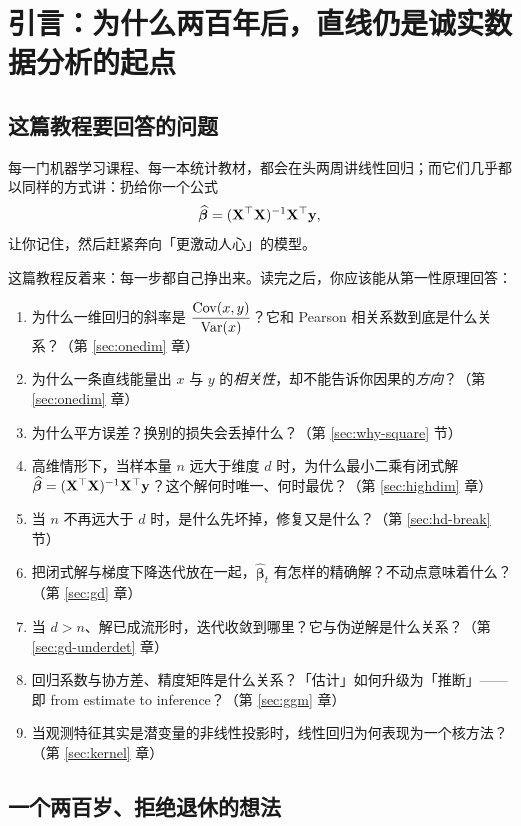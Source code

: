 \section{引言：为什么两百年后，直线仍是诚实数据分析的起点}\label{sec:intro}

\subsection{这篇教程要回答的问题}

每一门机器学习课程、每一本统计教材，都会在头两周讲线性回归；而它们几乎都以同样的方式讲：扔给你一个公式
\[
  \widehat{\bm{\beta}} = (\mathbf{X}^\top \mathbf{X})^{-1} \mathbf{X}^\top \mathbf{y},
\]
让你记住，然后赶紧奔向「更激动人心」的模型。

这篇教程反着来：每一步都自己挣出来。读完之后，你应该能从第一性原理回答：

\begin{enumerate}[label=(\arabic*)]
  \item 为什么一维回归的斜率是 $\dfrac{\mathrm{Cov}(x,y)}{\mathrm{Var}(x)}$？它和 Pearson 相关系数到底是什么关系？（第 \ref{sec:onedim} 章）
  \item 为什么一条直线能量出 $x$ 与 $y$ 的\textit{相关性}，却不能告诉你因果的\textit{方向}？（第 \ref{sec:onedim} 章）
  \item 为什么平方误差？换别的损失会丢掉什么？（第 \ref{sec:why-square} 节）
  \item 高维情形下，当样本量 $n$ 远大于维度 $d$ 时，为什么最小二乘有闭式解 $\widehat{\bm{\beta}} = (\mathbf{X}^\top\mathbf{X})^{-1}\mathbf{X}^\top\mathbf{y}$？这个解何时唯一、何时最优？（第 \ref{sec:highdim} 章）
  \item 当 $n$ 不再远大于 $d$ 时，是什么先坏掉，修复又是什么？（第 \ref{sec:hd-break} 节）
  \item 把闭式解与梯度下降迭代放在一起，$\widehat{\bm{\beta}}_t$ 有怎样的精确解？不动点意味着什么？（第 \ref{sec:gd} 章）
  \item 当 $d > n$、解已成流形时，迭代收敛到哪里？它与伪逆解是什么关系？（第 \ref{sec:gd-underdet} 章）
  \item 回归系数与协方差、精度矩阵是什么关系？「估计」如何升级为「推断」——即 from estimate to inference？（第 \ref{sec:ggm} 章）
  \item 当观测特征其实是潜变量的非线性投影时，线性回归为何表现为一个核方法？（第 \ref{sec:kernel} 章）
\end{enumerate}

\subsection{一个两百岁、拒绝退休的想法}

